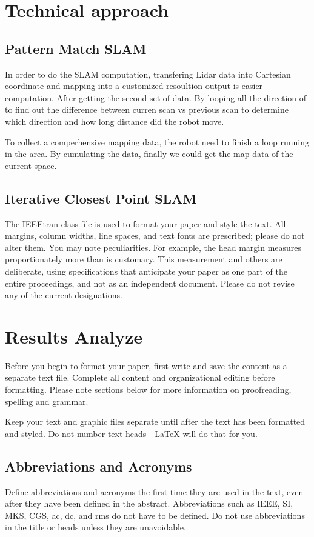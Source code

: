 \documentclass[conference]{IEEEtran}
\begin{document}
\section{Technical  approach}
\subsection{Pattern Match SLAM}
In order to do the SLAM computation, transfering Lidar data into Cartesian coordinate and mapping into a customized resoultion output is easier computation. After getting the second set of data. By looping all the direction of to find out the difference between curren scan vs previous scan to determine which direction and how long distance did the robot move.

To collect a comperhensive mapping data, the robot need to finish a loop running in the area. By cumulating the data, finally we could get the map data of the current space.
\subsection{Iterative Closest Point SLAM}
The IEEEtran class file is used to format your paper and style the text. All margins, 
column widths, line spaces, and text fonts are prescribed; please do not 
alter them. You may note peculiarities. For example, the head margin
measures proportionately more than is customary. This measurement 
and others are deliberate, using specifications that anticipate your paper 
as one part of the entire proceedings, and not as an independent document. 
Please do not revise any of the current designations.

\section{Results Analyze}
Before you begin to format your paper, first write and save the content as a 
separate text file. Complete all content and organizational editing before 
formatting. Please note sections below for more information on 
proofreading, spelling and grammar.

Keep your text and graphic files separate until after the text has been 
formatted and styled. Do not number text heads---{\LaTeX} will do that 
for you.

\subsection{Abbreviations and Acronyms}\label{AA}
Define abbreviations and acronyms the first time they are used in the text, 
even after they have been defined in the abstract. Abbreviations such as 
IEEE, SI, MKS, CGS, ac, dc, and rms do not have to be defined. Do not use 
abbreviations in the title or heads unless they are unavoidable.
\end{document}
